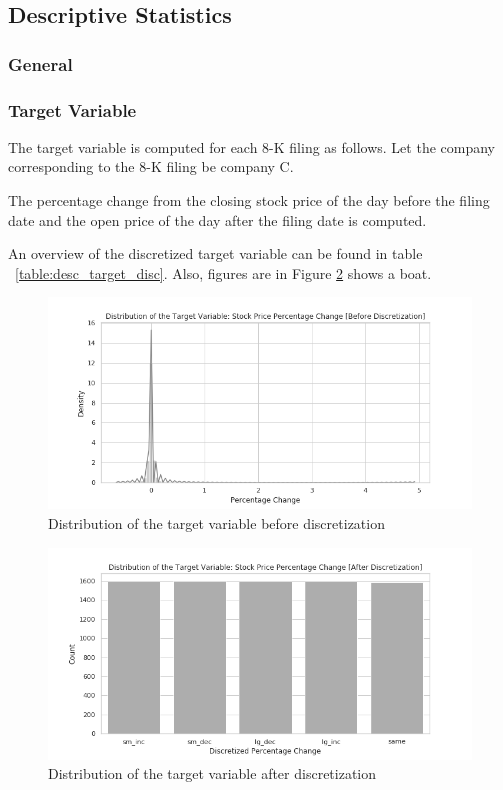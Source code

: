 \documentclass{article}
\begin{document}
	
	\subsection{Descriptive Statistics}
	
	

	\subsubsection{General}
	
	\subsubsection{Target Variable}
	
	The target variable is computed for each 8-K filing as follows. Let the company corresponding to the 8-K filing be company C.
	
	The percentage change from the closing stock price of the day before the filing date and the open price of the day after the filing date is computed.
	
	An overview of the discretized target variable can be found in 	table ~\ref{table:desc_target_disc}. Also, figures are in 	Figure \ref{fig:dist_target_disc} shows a boat.
	
	\begin{figure}[h!]
		\includegraphics[width=\linewidth]{img/dist_target_nondisc.png}
		\caption{Distribution of the target variable before discretization}
		\label{fig:dist_target_nondisc}
	\end{figure}

	\begin{figure}[h!]
		\includegraphics[width=\linewidth]{img/dist_target_disc.png}
		\caption{Distribution of the target variable after discretization}
		\label{fig:dist_target_disc}
	\end{figure}
	
\end{document}
